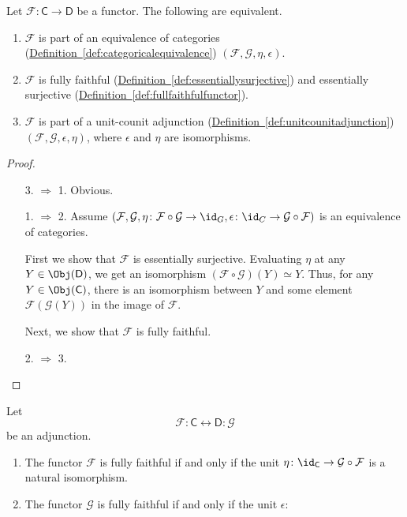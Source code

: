 \documentclass[notes.tex]{subfiles}
\begin{document}
\begin{theorem}
  Let $\mathcal{F}\colon \mathsf{C} \to \mathsf{D}$ be a functor. The following are equivalent.
  \begin{enumerate}
    \item $\mathcal{F}$ is part of an equivalence of categories (\hyperref[def:categoricalequivalence]{Definition~\ref*{def:categoricalequivalence}}) $(\mathcal{F}, \mathcal{G}, \eta, \epsilon)$.

    \item $\mathcal{F}$ is fully faithful (\hyperref[def:essentiallysurjective]{Definition~\ref*{def:essentiallysurjective}}) and essentially surjective (\hyperref[def:fullfaithfulfunctor]{Definition~\ref*{def:fullfaithfulfunctor}}).

    \item $\mathcal{F}$ is part of a unit-counit adjunction (\hyperref[def:unitcounitadjunction]{Definition~\ref*{def:unitcounitadjunction}}) $(\mathcal{F}, \mathcal{G}, \epsilon, \eta)$, where $\epsilon$ and $\eta$ are isomorphisms.
  \end{enumerate}
\end{theorem}
\begin{proof}
  \leavevmode
  \begin{enumerate}
    \item[3. $\Rightarrow$ 1.] Obvious.

    \item[1. $\Rightarrow$ 2.] Assume $(\mathcal{F}, \mathcal{G}, \eta\colon \mathcal{F} \circ \mathcal{G} \to \id_{G}, \epsilon\colon \id_{C} \to \mathcal{G} \circ \mathcal{F})$ is an equivalence of categories.

      First we show that $\mathcal{F}$ is essentially surjective. Evaluating $\eta$ at any $Y \in \Obj(\mathsf{D})$, we get an isomorphism $(\mathcal{F} \circ \mathcal{G})(Y) \simeq Y$. Thus, for any $Y \in \Obj(\mathsf{C})$, there is an isomorphism between $Y$ and some element $\mathcal{F}(\mathcal{G}(Y))$ in the image of $\mathcal{F}$.

      Next, we show that $\mathcal{F}$ is fully faithful.

    \item[2. $\Rightarrow$ 3.]
  \end{enumerate}
\end{proof}

\begin{proposition}
  Let
  \begin{equation*}
    \mathcal{F} : \mathsf{C} \leftrightarrow \mathsf{D} : \mathcal{G}
  \end{equation*}
  be an adjunction.
  \begin{enumerate}
    \item The functor $\mathcal{F}$ is fully faithful if and only if the unit $\eta\colon \id_{\mathsf{C}} \to \mathcal{G} \circ \mathcal{F}$ is a natural isomorphism.

    \item The functor $\mathcal{G}$ is fully faithful if and only if the unit $\epsilon\colon $
  \end{enumerate}
\end{proposition}
\end{document}
